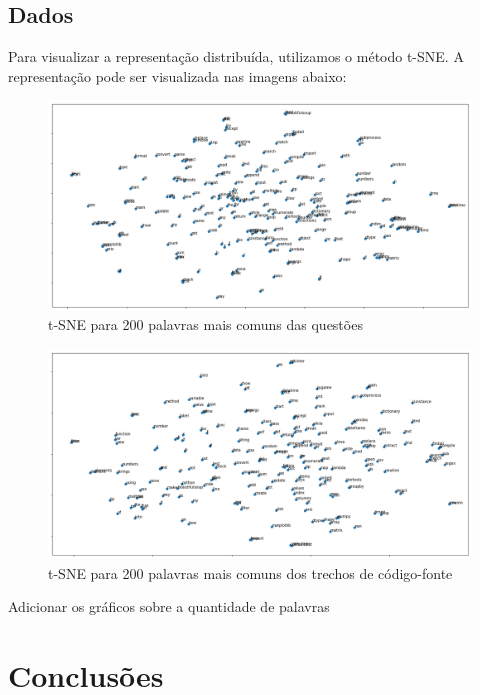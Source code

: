 \documentclass[12pt]{article}
\begin{document}
\subsection{Dados}

Para visualizar a representação distribuída, utilizamos o método t-SNE. A representação pode ser visualizada nas imagens abaixo:

\begin{figure}[h]
\includegraphics[width=14cm]{figures/tsne-question.png}
\caption{t-SNE para 200 palavras mais comuns das questões}
\label{fig:tsne-questao}
\end{figure}

\begin{figure}[h]
\includegraphics[width=14cm]{figures/tsne-code.png}
\caption{t-SNE para 200 palavras mais comuns dos trechos de código-fonte}
\label{fig:tsne-codigo}
\end{figure}

Adicionar os gráficos sobre a quantidade de palavras


\section{Conclusões}





\end{document}
